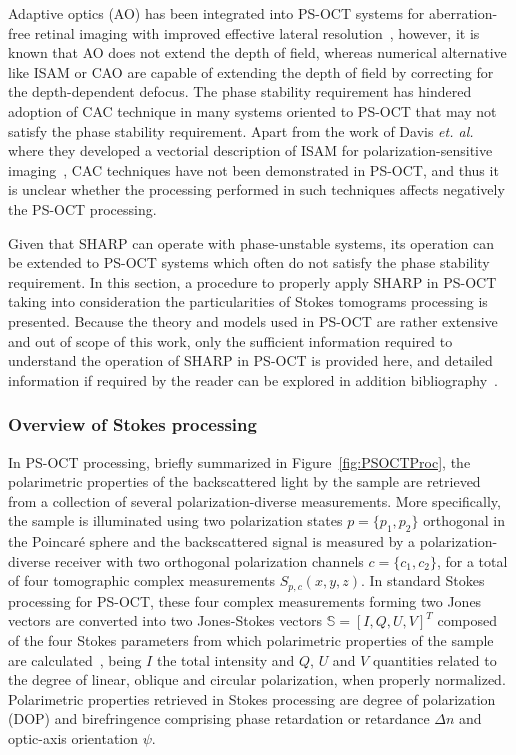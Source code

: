 Adaptive optics (AO) has been integrated into PS-OCT systems for aberration-free retinal imaging with improved effective lateral resolution~\cite{Cense2009_Retinal}, however, it is known that AO does not extend the depth of field, whereas numerical alternative like ISAM or CAO are capable of extending the depth of field by correcting for the depth-dependent defocus. The phase stability requirement has hindered adoption of CAC technique in many systems oriented to PS-OCT that may not satisfy the phase stability requirement. Apart from the work of Davis \textit{et. al.} where they developed a vectorial description of ISAM for polarization-sensitive imaging~\cite{Davis2007_Nonparaxial, Davis2007_Polarimetric}, CAC techniques have not been demonstrated in PS-OCT, and thus it is unclear whether the processing performed in such techniques affects negatively the PS-OCT processing.

Given that SHARP can operate with phase-unstable systems, its operation can be extended to PS-OCT systems which often do not satisfy the phase stability requirement. In this section, a procedure to properly apply SHARP in PS-OCT taking into consideration the particularities of Stokes tomograms processing is presented. Because the theory and models used in PS-OCT are rather extensive and out of scope of this work, only the sufficient information required to understand the operation of SHARP in PS-OCT is provided here, and detailed information if required by the reader can be explored in addition bibliography~\cite{deBoer2017_Polarization, Villiger2013_Spectral}.

\subsubsection{Overview of Stokes processing}

In PS-OCT processing, briefly summarized in Figure~\ref{fig:PSOCTProc}, the polarimetric properties of the backscattered light by the sample are retrieved from a collection of several polarization-diverse measurements. More specifically, the sample is illuminated using two polarization states $p=\{p_1, p_2\}$ orthogonal in the Poincar\'e sphere and the backscattered signal is measured by a polarization-diverse receiver with two orthogonal polarization channels $c=\{c_1, c_2\}$, for a total of four tomographic complex measurements $S_{p,c}(x,y,z)$. In standard Stokes processing for PS-OCT, these four complex measurements forming two Jones vectors are converted into two Jones-Stokes vectors $\mathbf{\mathbb{S}} = [I, Q, U, V]^T$ composed of the four Stokes parameters from which polarimetric properties of the sample are calculated~\cite{deBoer2017_Polarization}, being $I$ the total intensity and $Q$, $U$ and $V$ quantities related to the degree of linear, oblique and circular polarization, when properly normalized. Polarimetric properties retrieved in Stokes processing are degree of polarization (DOP) and birefringence comprising phase retardation or retardance $\Delta n$ and optic-axis orientation $\psi$. 

